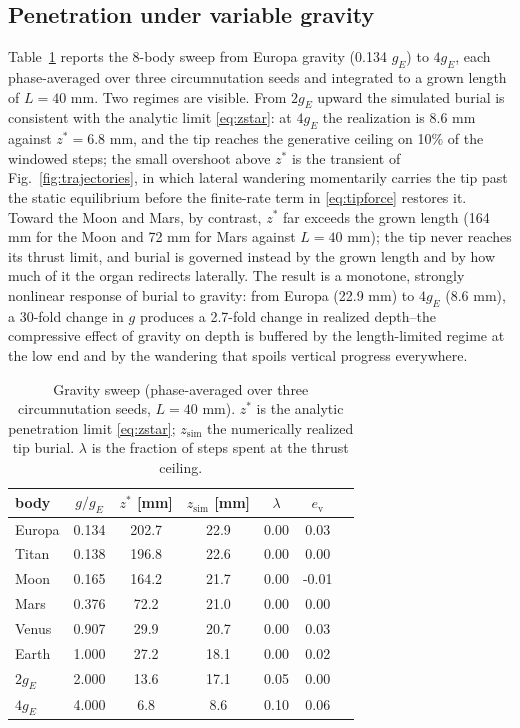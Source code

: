 \documentclass[preprint,12pt]{elsarticle}
\begin{document}
\subsection{Penetration under variable gravity}
\label{sec:gravity}

Table~\ref{tab:gravity} reports the 8-body sweep from Europa gravity (0.134
$g_E$) to $4g_E$, each phase-averaged over three circumnutation seeds and
integrated to a grown length of $L=40$ mm. Two regimes are visible. From
$2g_E$ upward the simulated burial is consistent with the analytic limit
\eqref{eq:zstar}: at $4g_E$ the realization is $8.6$ mm against
$z^{*}=6.8$ mm, and the tip reaches the generative ceiling on 10\% of the
windowed steps; the small overshoot above $z^{*}$ is the transient of
Fig.~\ref{fig:trajectories}, in which lateral wandering momentarily carries
the tip past the static equilibrium before the finite-rate term in
\eqref{eq:tipforce} restores it. Toward the Moon and Mars, by contrast,
$z^{*}$ far exceeds the grown length (164 mm for the Moon and 72 mm for Mars
against $L=40$ mm); the tip never reaches its thrust limit, and burial is
governed instead by the grown length and by how much of it the organ
redirects laterally. The result is a monotone, strongly nonlinear response of
burial to gravity: from Europa (22.9 mm) to $4g_E$ (8.6 mm), a 30-fold
change in $g$ produces a 2.7-fold change in realized depth--the compressive
effect of gravity on depth is buffered by the length-limited regime at the
low end and by the wandering that spoils vertical progress everywhere.

\begin{table}[t]
\centering
\caption{Gravity sweep (phase-averaged over three circumnutation seeds,
$L=40$ mm). $z^{*}$ is the analytic penetration limit
\eqref{eq:zstar}; $z_{\mathrm{sim}}$ the numerically realized tip burial.
$\lambda$ is the fraction of steps spent at the thrust ceiling.}
\label{tab:gravity}
\begin{tabular}{lcccccc}
\toprule
body & $g/g_E$ & $z^{*}$ [mm] & $z_{\mathrm{sim}}$ [mm] &
$\lambda$ & $e_\mathrm{v}$ \\
\midrule
Europa & 0.134 & 202.7 & 22.9 & 0.00 & 0.03 \\
Titan  & 0.138 & 196.8 & 22.6 & 0.00 & 0.00 \\
Moon   & 0.165 & 164.2 & 21.7 & 0.00 & -0.01 \\
Mars   & 0.376 &  72.2 & 21.0 & 0.00 & 0.00 \\
Venus  & 0.907 &  29.9 & 20.7 & 0.00 & 0.03 \\
Earth  & 1.000 &  27.2 & 18.1 & 0.00 & 0.02 \\
$2g_E$ & 2.000 &  13.6 & 17.1 & 0.05 & 0.00 \\
$4g_E$ & 4.000 &   6.8 &  8.6 & 0.10 & 0.06 \\
\bottomrule
\end{tabular}
\end{table}
\end{document}
